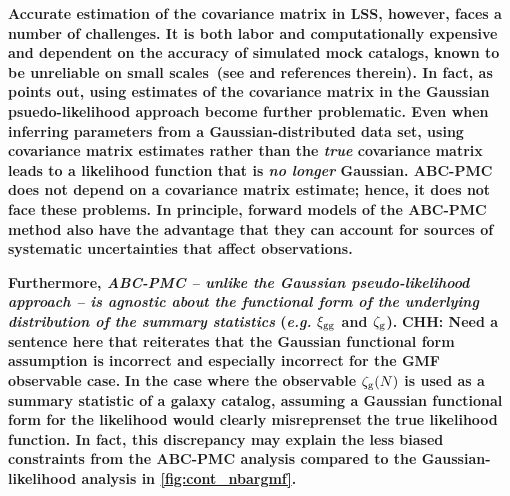 \documentclass[fleqn,usenatbib]{mnras}
\begin{document}
{\bf \color{dred} 
Accurate estimation of the covariance matrix 
in LSS, however, faces a number of challenges. It is both labor and computationally 
expensive and dependent on the accuracy of simulated mock catalogs, known to be 
unreliable on small scales~(see \citealt{cosmiccode,nifty} and references therein). 
In fact, as \cite{Sellentin:2016a} points out, using estimates of the covariance 
matrix in the Gaussian psuedo-likelihood approach become further problematic. Even 
when inferring parameters from a Gaussian-distributed data set, using covariance 
matrix estimates rather than the {\em true} covariance matrix leads to a likelihood 
function that is {\em no longer} Gaussian.
ABC-PMC does not depend on a covariance matrix estimate; hence, it does not face 
these problems. In principle, forward models of the ABC-PMC method also have the 
advantage that they can account for sources of systematic uncertainties that affect 
observations.
}

{\bf \color{dred}
Furthermore, {\em ABC-PMC -- unlike the Gaussian pseudo-likelihood approach -- 
is agnostic about the functional form of the underlying distribution of the 
summary statistics} (\emph{e.g.} $\xi_{\mathrm{gg}}$ and $\mathcal{\zeta}_{\rm g}$). 
}
{\bf \color{darkgreen}
CHH: Need a sentence here that reiterates that the Gaussian functional form 
assumption is incorrect and especially incorrect for the GMF observable case.
}
{\bf \color{dred}
In the case where the observable $\mathcal{\zeta}_{\rm g}(N)$ is used as a summary statistic
of a galaxy catalog, assuming a Gaussian functional form for the likelihood
would clearly misreprenset the true likelihood function. In fact, this 
discrepancy may explain the less biased constraints from the ABC-PMC analysis 
compared to the Gaussian-likelihood analysis in \ref{fig:cont_nbargmf}.
}
\end{document}
